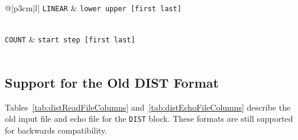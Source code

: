 \begin{center}
\begin{longtable}{@{\extracolsep{\fill}}|p{3cm}|l|}
    \rowcolor{gray!15}
    \texttt{LINEAR} & \texttt{lower upper [first last]} \\*
    \hline
    \multicolumn{2}{|>{\raggedright}p{\textwidth}|}{%
        Fills the array with floating point values ranging between the values \texttt{lower} and \texttt{upper} in equal steps.
        Can be used with all floating point column formats except \texttt{MASS}.
    } \\*
    \hline

    \rowcolor{gray!15}
    \texttt{COUNT} & \texttt{start step [first last]} \\*
    \hline
    \multicolumn{2}{|>{\raggedright}p{\textwidth}|}{%
        Fills the array with integer values starting from \texttt{start}, with a given \texttt{step}.
        Can be used with column format \texttt{ID}.
    } \\*
    \hline

\end{longtable}
\end{center}

\subsection{Support for the Old DIST Format}

Tables~\ref{tab:distReadFileColumns} and~\ref{tab:distEchoFileColumns} describe the old input file and echo file for the \texttt{DIST} block.
These formats are still supported for backwards compatibility.

